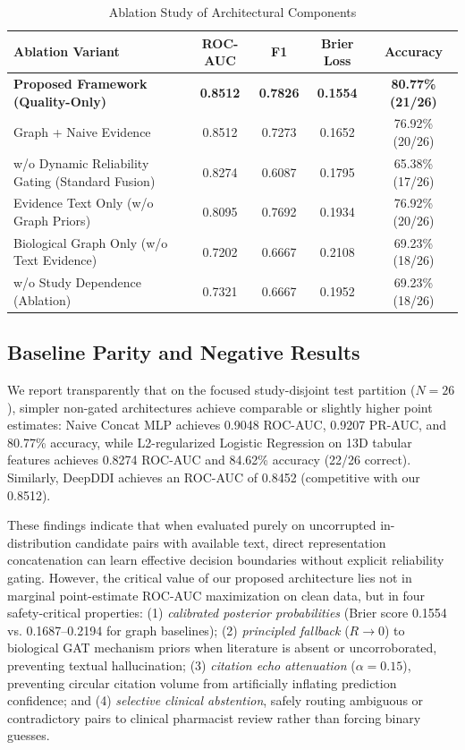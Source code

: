 \documentclass[10pt,journal,compsoc]{IEEEtran}
\begin{document}
\begin{table}[h]
\centering
\caption{Ablation Study of Architectural Components}
\label{tab:ablations}
\small
\begin{tabular}{lcccc}
\toprule
\textbf{Ablation Variant} & \textbf{ROC-AUC} & \textbf{F1} & \textbf{Brier Loss} & \textbf{Accuracy} \\
\midrule
\textbf{Proposed Framework (Quality-Only)} & \textbf{0.8512} & \textbf{0.7826} & \textbf{0.1554} & \textbf{80.77\% (21/26)} \\
Graph + Naive Evidence & 0.8512 & 0.7273 & 0.1652 & 76.92\% (20/26) \\
w/o Dynamic Reliability Gating (Standard Fusion) & 0.8274 & 0.6087 & 0.1795 & 65.38\% (17/26) \\
Evidence Text Only (w/o Graph Priors) & 0.8095 & 0.7692 & 0.1934 & 76.92\% (20/26) \\
Biological Graph Only (w/o Text Evidence) & 0.7202 & 0.6667 & 0.2108 & 69.23\% (18/26) \\
w/o Study Dependence (Ablation) & 0.7321 & 0.6667 & 0.1952 & 69.23\% (18/26) \\
\bottomrule
\end{tabular}
\end{table}

\subsection{Baseline Parity and Negative Results}
We report transparently that on the focused study-disjoint test partition ($N=26$), simpler non-gated architectures achieve comparable or slightly higher point estimates: Naive Concat MLP achieves 0.9048 ROC-AUC, 0.9207 PR-AUC, and 80.77\% accuracy, while L2-regularized Logistic Regression on 13D tabular features achieves 0.8274 ROC-AUC and 84.62\% accuracy (22/26 correct). Similarly, DeepDDI achieves an ROC-AUC of 0.8452 (competitive with our 0.8512). 

These findings indicate that when evaluated purely on uncorrupted in-distribution candidate pairs with available text, direct representation concatenation can learn effective decision boundaries without explicit reliability gating. However, the critical value of our proposed architecture lies not in marginal point-estimate ROC-AUC maximization on clean data, but in four safety-critical properties: (1) \textit{calibrated posterior probabilities} (Brier score 0.1554 vs. 0.1687--0.2194 for graph baselines); (2) \textit{principled fallback} ($R \to 0$) to biological GAT mechanism priors when literature is absent or uncorroborated, preventing textual hallucination; (3) \textit{citation echo attenuation} ($\alpha = 0.15$), preventing circular citation volume from artificially inflating prediction confidence; and (4) \textit{selective clinical abstention}, safely routing ambiguous or contradictory pairs to clinical pharmacist review rather than forcing binary guesses.
\end{document}
